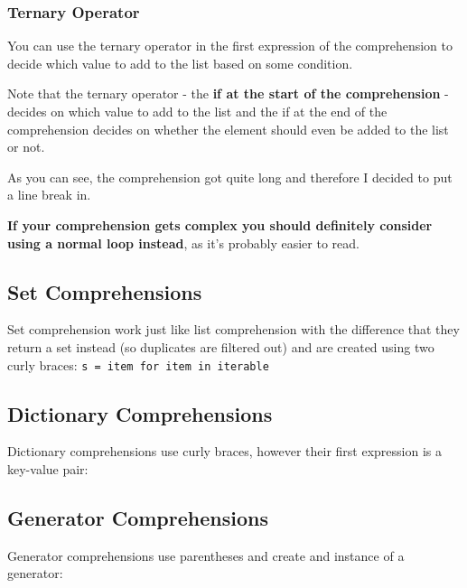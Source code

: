         \subsubsection{Ternary Operator}

            You can use the ternary operator in the first expression of the comprehension to decide
            which value to add to the list based on some condition.

            Note that the ternary operator - the \textbf{if at the start of the comprehension} -
            decides on which value to add to the list and the if at the end of the comprehension
            decides on whether the element should even be added to the list or not.


            As you can see, the comprehension got quite long and therefore I decided to put
            a line break in.

            \textbf{If your comprehension gets complex you should definitely consider using a normal
            loop instead}, as it's probably easier to read.

    \subsection{Set Comprehensions}

        Set comprehension work just like list comprehension with the difference that they return a
        set instead (so duplicates are filtered out) and are created using two curly braces:
        \texttt{s = {item for item in iterable}}

    \subsection{Dictionary Comprehensions}

        Dictionary comprehensions use curly braces, however their first expression is a key-value
        pair:


    \subsection{Generator Comprehensions}

        Generator comprehensions use parentheses and create and instance of a generator:

